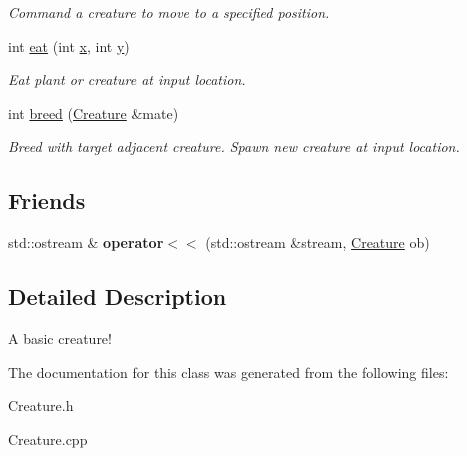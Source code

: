 \begin{DoxyCompactItemize}
\begin{DoxyCompactList}\small\item\em \-Command a creature to move to a specified position. \end{DoxyCompactList}\item 
\hypertarget{classCreature_ac287d66f19bed736fc2d3e169d68e380}{int \hyperlink{classCreature_ac287d66f19bed736fc2d3e169d68e380}{eat} (int \hyperlink{classCreature_a356a4d67f5e39929cbd83303fd9a1a32}{x}, int \hyperlink{classCreature_a3d5b3216f5d659a16f5ea9dacc5e3463}{y})}\label{classCreature_ac287d66f19bed736fc2d3e169d68e380}

\begin{DoxyCompactList}\small\item\em \-Eat plant or creature at input location. \end{DoxyCompactList}\item 
\hypertarget{classCreature_ad000357216d79a88b23bdb4c5c30bc37}{int \hyperlink{classCreature_ad000357216d79a88b23bdb4c5c30bc37}{breed} (\hyperlink{classCreature}{\-Creature} \&mate)}\label{classCreature_ad000357216d79a88b23bdb4c5c30bc37}

\begin{DoxyCompactList}\small\item\em \-Breed with target adjacent creature. \-Spawn new creature at input location. \end{DoxyCompactList}\end{DoxyCompactItemize}
\subsection*{\-Friends}
\begin{DoxyCompactItemize}
\item 
\hypertarget{classCreature_aa60f0b258942324930410a7c2e9f3620}{std\-::ostream \& {\bfseries operator$<$$<$} (std\-::ostream \&stream, \hyperlink{classCreature}{\-Creature} ob)}\label{classCreature_aa60f0b258942324930410a7c2e9f3620}

\end{DoxyCompactItemize}


\subsection{\-Detailed \-Description}
\-A basic creature! 

\-The documentation for this class was generated from the following files\-:\begin{DoxyCompactItemize}
\item 
\-Creature.\-h\item 
\-Creature.\-cpp\end{DoxyCompactItemize}
